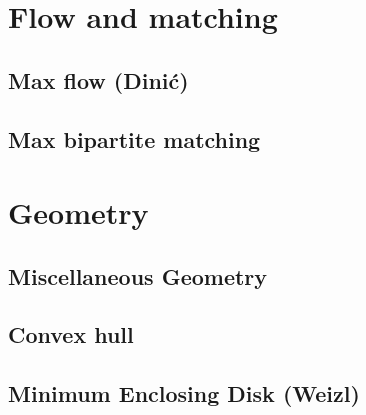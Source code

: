 \documentclass[12pt]{extarticle}
\begin{document}
\begin{multicols*}{2}
\setlength{\parskip}{0.0in}
\setlength{\parskip}{0.0in}
\section{Flow and matching}

\subsection{Max flow (Dini\'c)} %


% 

\subsection{Max bipartite matching} %





\section{Geometry}

\subsection{Miscellaneous Geometry} %



\subsection{Convex hull} %


\subsection{Minimum Enclosing Disk (Weizl)} 



\end{multicols*}
\end{document}

